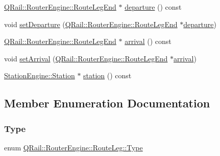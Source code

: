 \begin{DoxyCompactItemize}
\item 
\mbox{\hyperlink{classQRail_1_1RouterEngine_1_1RouteLegEnd}{Q\+Rail\+::\+Router\+Engine\+::\+Route\+Leg\+End}} $\ast$ \mbox{\hyperlink{classQRail_1_1RouterEngine_1_1RouteLeg_ae47477e71e222d39e060852e40679ef2}{departure}} () const
\item 
void \mbox{\hyperlink{classQRail_1_1RouterEngine_1_1RouteLeg_a1f478cdbe5ba2d3cb8030f40925c1525}{set\+Departure}} (\mbox{\hyperlink{classQRail_1_1RouterEngine_1_1RouteLegEnd}{Q\+Rail\+::\+Router\+Engine\+::\+Route\+Leg\+End}} $\ast$\mbox{\hyperlink{classQRail_1_1RouterEngine_1_1RouteLeg_ae47477e71e222d39e060852e40679ef2}{departure}})
\item 
\mbox{\hyperlink{classQRail_1_1RouterEngine_1_1RouteLegEnd}{Q\+Rail\+::\+Router\+Engine\+::\+Route\+Leg\+End}} $\ast$ \mbox{\hyperlink{classQRail_1_1RouterEngine_1_1RouteLeg_a64234d433c30c991555722de85094d17}{arrival}} () const
\item 
void \mbox{\hyperlink{classQRail_1_1RouterEngine_1_1RouteLeg_a115b73fdf4f83f41d84a3556302e29fe}{set\+Arrival}} (\mbox{\hyperlink{classQRail_1_1RouterEngine_1_1RouteLegEnd}{Q\+Rail\+::\+Router\+Engine\+::\+Route\+Leg\+End}} $\ast$\mbox{\hyperlink{classQRail_1_1RouterEngine_1_1RouteLeg_a64234d433c30c991555722de85094d17}{arrival}})
\item 
\mbox{\hyperlink{classQRail_1_1StationEngine_1_1Station}{Station\+Engine\+::\+Station}} $\ast$ \mbox{\hyperlink{classQRail_1_1RouterEngine_1_1RouteLeg_a7da431ef9f4504420e37f19f2d938e58}{station}} () const
\end{DoxyCompactItemize}


\subsection{Member Enumeration Documentation}
\mbox{\label{classQRail_1_1RouterEngine_1_1RouteLeg_af31dfcc23f2ae80f7fb0feca24cb9816}} 
\subsubsection{\texorpdfstring{Type}{Type}}
{\footnotesize\ttfamily enum \mbox{\hyperlink{classQRail_1_1RouterEngine_1_1RouteLeg_af31dfcc23f2ae80f7fb0feca24cb9816}{Q\+Rail\+::\+Router\+Engine\+::\+Route\+Leg\+::\+Type}}\hspace{0.3cm}{\ttfamily [strong]}}

